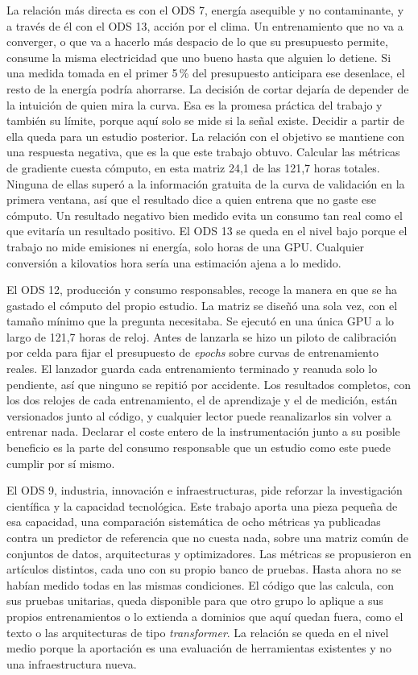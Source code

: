 La relación más directa es con el ODS 7, energía asequible y no contaminante, y a través de él con el ODS 13, acción por el clima. Un entrenamiento que no va a converger, o que va a hacerlo más despacio de lo que su presupuesto permite, consume la misma electricidad que uno bueno hasta que alguien lo detiene. Si una medida tomada en el primer 5\,\% del presupuesto anticipara ese desenlace, el resto de la energía podría ahorrarse. La decisión de cortar dejaría de depender de la intuición de quien mira la curva. Esa es la promesa práctica del trabajo y también su límite, porque aquí solo se mide si la señal existe. Decidir a partir de ella queda para un estudio posterior. La relación con el objetivo se mantiene con una respuesta negativa, que es la que este trabajo obtuvo. Calcular las métricas de gradiente cuesta cómputo, en esta matriz 24,1 de las 121,7 horas totales. Ninguna de ellas superó a la información gratuita de la curva de validación en la primera ventana, así que el resultado dice a quien entrena que no gaste ese cómputo. Un resultado negativo bien medido evita un consumo tan real como el que evitaría un resultado positivo. El ODS 13 se queda en el nivel bajo porque el trabajo no mide emisiones ni energía, solo horas de una GPU. Cualquier conversión a kilovatios hora sería una estimación ajena a lo medido.

El ODS 12, producción y consumo responsables, recoge la manera en que se ha gastado el cómputo del propio estudio. La matriz se diseñó una sola vez, con el tamaño mínimo que la pregunta necesitaba. Se ejecutó en una única GPU a lo largo de 121,7 horas de reloj. Antes de lanzarla se hizo un piloto de calibración por celda para fijar el presupuesto de \emph{epochs} sobre curvas de entrenamiento reales. El lanzador guarda cada entrenamiento terminado y reanuda solo lo pendiente, así que ninguno se repitió por accidente. Los resultados completos, con los dos relojes de cada entrenamiento, el de aprendizaje y el de medición, están versionados junto al código, y cualquier lector puede reanalizarlos sin volver a entrenar nada. Declarar el coste entero de la instrumentación junto a su posible beneficio es la parte del consumo responsable que un estudio como este puede cumplir por sí mismo.

El ODS 9, industria, innovación e infraestructuras, pide reforzar la investigación científica y la capacidad tecnológica. Este trabajo aporta una pieza pequeña de esa capacidad, una comparación sistemática de ocho métricas ya publicadas contra un predictor de referencia que no cuesta nada, sobre una matriz común de conjuntos de datos, arquitecturas y optimizadores. Las métricas se propusieron en artículos distintos, cada uno con su propio banco de pruebas. Hasta ahora no se habían medido todas en las mismas condiciones. El código que las calcula, con sus pruebas unitarias, queda disponible para que otro grupo lo aplique a sus propios entrenamientos o lo extienda a dominios que aquí quedan fuera, como el texto o las arquitecturas de tipo \emph{transformer}. La relación se queda en el nivel medio porque la aportación es una evaluación de herramientas existentes y no una infraestructura nueva.

